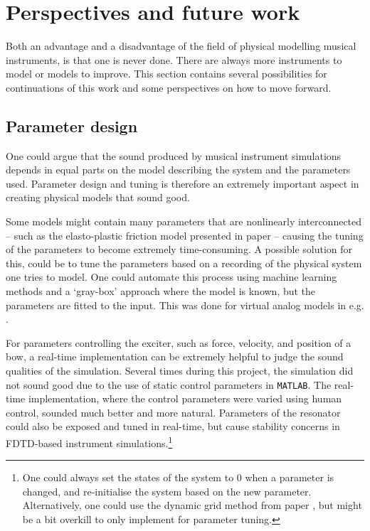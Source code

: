 

\section{Perspectives and future work}
Both an advantage and a disadvantage of the field of physical modelling musical instruments, is that one is never done. There are always more instruments to model or models to improve. This section contains several possibilities for continuations of this work and some perspectives on how to move forward.

\subsection{Parameter design}\label{sec:parameterDesign}
One could argue that the sound produced by musical instrument simulations depends in equal parts on the model describing the system and the parameters used. Parameter design and tuning is therefore an extremely important aspect in creating physical models that sound good. 

Some models might contain many parameters that are nonlinearly interconnected -- such as the elasto-plastic friction model presented in paper \citeP[C] -- causing the tuning of the parameters to become extremely time-consuming. A possible solution for this, could be to tune the parameters based on a recording of the physical system one tries to model. 
One could automate this process using machine learning methods and a `gray-box' approach where the model is known, but the parameters are fitted to the input. This was done for virtual analog models in e.g. \cite{Eichas2017, Parker2019}. 

For parameters controlling the exciter, such as force, velocity, and position of a bow, a real-time implementation can be extremely helpful to judge the sound qualities of the simulation. Several times during this project, the simulation did not sound good due to the use of static control parameters in \texttt{MATLAB}. The real-time implementation, where the control parameters were varied using human control, sounded much better and more natural. Parameters of the resonator could also be exposed and tuned in real-time, but cause stability concerns in FDTD-based instrument simulations.\footnote{One could always set the states of the system to 0 when a parameter is changed, and re-initialise the system based on the new parameter. Alternatively, one could use the dynamic grid method from paper \citeP[G], but might be a bit overkill to only implement for parameter tuning.}

